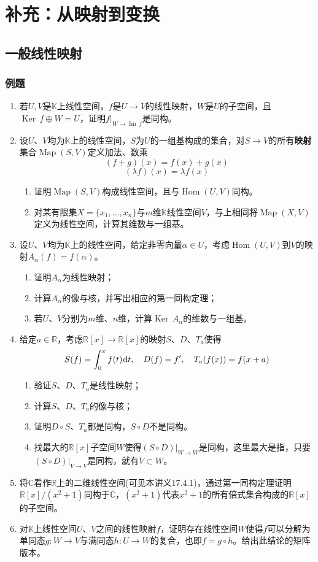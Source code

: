 \documentclass[a4paper,UTF8,fontset=windows,AutoFakeBold]{ctexart}
\DeclareMathOperator{\im}{Im\,}
\DeclareMathOperator{\Ker}{Ker\,}
\DeclareMathOperator{\Hom}{Hom}
\DeclareMathOperator{\Map}{Map}
\newcommand*{\dr}{\hspace{0.07em}\mathrm{d}}
\begin{document}
\section{补充：从映射到变换}
\subsection{一般线性映射}
\subsubsection{例题}
\begin{enumerate}
    \item 若$U,V$是$\mathbb{K}$上线性空间，$f$是$U\to V$的线性映射，$W$是$U$的子空间，且$\Ker f\oplus W=U$，证明$f|_{W\to\im f}$是同构。
    \item 设$U$、$V$均为$\mathbb{K}$上的线性空间，$S$为$U$的一组基构成的集合，对$S\to V$的所有\textbf{映射}集合$\Map(S,V)$定义加法、数乘
    $$(f+g)(x)=f(x)+g(x)$$
    $$(\lambda f)(x)=\lambda f(x)$$
    \begin{enumerate}
        \item 证明$\Map(S,V)$构成线性空间，且与$\Hom(U,V)$同构。
        \item 对某有限集$X=\{x_1,\dots,x_n\}$与$m$维$\mathbb{K}$线性空间$V$，与上相同将$\Map(X,V)$定义为线性空间，计算其维数与一组基。
    \end{enumerate}
    
    \item 设$U$、$V$均为$\mathbb{K}$上的线性空间，给定非零向量$\alpha\in U$，考虑$\Hom(U,V)$到$V$的映射$A_\alpha(f)=f(\alpha)$。
    \begin{enumerate}
        \item 证明$A_\alpha$为线性映射；
        \item 计算$A_\alpha$的像与核，并写出相应的第一同构定理；
        \item 若$U$、$V$分别为$m$维、$n$维，计算$\Ker A_\alpha$的维数与一组基。
    \end{enumerate}
    \item 给定$a\in\mathbb{R}$，考虑$\mathbb{R}[x]\to\mathbb{R}[x]$的映射$S$、$D$、$T_a$使得
    $$S(f)=\int_0^xf(t)\dr t,\quad D(f)=f',\quad T_a(f(x))=f(x+a)$$
    \begin{enumerate}
        \item 验证$S$、$D$、$T_a$是线性映射；
        \item 计算$S$、$D$、$T_a$的像与核；
        \item 证明$D\circ S$、$T_a$都是同构，$S\circ D$不是同构。
        \item 找最大的$\mathbb{R}[x]$子空间$W$使得$(S\circ D)|_{W\to W}$是同构，这里最大是指，只要$(S\circ D)|_{V\to V}$是同构，就有$V\subset W$。
    \end{enumerate}
    \item 将$\mathbb{C}$看作$\mathbb{R}$上的二维线性空间(可见本讲义17.4.1)，通过第一同构定理证明$\mathbb{R}[x]/(x^2+1)$同构于$\mathbb{C}$，$(x^2+1)$代表$x^2+1$的所有倍式集合构成的$\mathbb{R}[x]$的子空间。
    \item 对$\mathbb{K}$上线性空间$U$、$V$之间的线性映射$f$，证明存在线性空间$W$使得$f$可以分解为单同态$g:W\to V$与满同态$h:U\to W$的复合，也即$f=g\circ h$。给出此结论的矩阵版本。
\end{enumerate}
\end{document}
